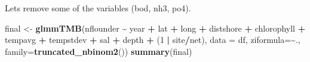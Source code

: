 \documentclass[
]{article}
\newenvironment{Shaded}{\begin{snugshade}}{\end{snugshade}}
\newcommand{\AttributeTok}[1]{\textcolor[rgb]{0.13,0.29,0.53}{#1}}
\newcommand{\DecValTok}[1]{\textcolor[rgb]{0.00,0.00,0.81}{#1}}
\newcommand{\FunctionTok}[1]{\textcolor[rgb]{0.13,0.29,0.53}{\textbf{#1}}}
\newcommand{\NormalTok}[1]{#1}
\newcommand{\OtherTok}[1]{\textcolor[rgb]{0.56,0.35,0.01}{#1}}
\newcommand{\SpecialCharTok}[1]{\textcolor[rgb]{0.81,0.36,0.00}{\textbf{#1}}}
\begin{document}
Lets remove some of the variables (bod, nh3, po4).

\begin{Shaded}
\begin{Highlighting}[]
\NormalTok{final }\OtherTok{\textless{}{-}} \FunctionTok{glmmTMB}\NormalTok{(nflounder }\SpecialCharTok{\textasciitilde{}}\NormalTok{ year }\SpecialCharTok{+}\NormalTok{ lat }\SpecialCharTok{+}\NormalTok{ long }\SpecialCharTok{+}\NormalTok{ distshore }\SpecialCharTok{+}\NormalTok{ chlorophyll }\SpecialCharTok{+}\NormalTok{ tempavg }\SpecialCharTok{+}\NormalTok{ tempstdev }\SpecialCharTok{+}\NormalTok{ sal }\SpecialCharTok{+}\NormalTok{ depth }\SpecialCharTok{+}\NormalTok{ (}\DecValTok{1} \SpecialCharTok{|}\NormalTok{ site}\SpecialCharTok{/}\NormalTok{net), }
    \AttributeTok{data =}\NormalTok{ df, }
    \AttributeTok{ziformula=}\SpecialCharTok{\textasciitilde{}}\NormalTok{.,}
    \AttributeTok{family=}\FunctionTok{truncated\_nbinom2}\NormalTok{())}
\FunctionTok{summary}\NormalTok{(final)}
\end{Highlighting}
\end{Shaded}
\end{document}
